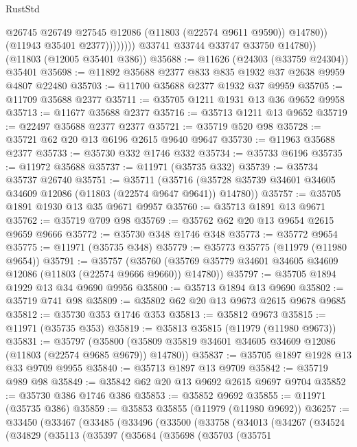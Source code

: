 \begin{lexlean}{RustStd}
\begin{coremodule}
                          @26745
                          @26749
                          @27545
                          @12086
                          (@11803 (@22574 @9611 @9590))
                          @14780))
                      (@11943 @35401 @2377))))))))
        @33741
        @33744
        @33747
        @33750
        @14780))
    (@11803 (@12005 @35401 @386))
@35688 := @11626 (@24303 (@33759 @24304)) @35401
@35698 := @11892 @35688 @2377 @833 @835 @1932 @37 @2638 @9959 @4807 @22480
@35703 := @11700 @35688 @2377 @1932 @37 @9959
@35705 := @11709 @35688 @2377
@35711 := @35705 @1211 @1931 @13 @36 @9652 @9958
@35713 := @11677 @35688 @2377
@35716 := @35713 @1211 @13 @9652
@35719 := @22497 @35688 @2377 @2377
@35721 := @35719 @520 @98
@35728 := @35721 @62 @20 @13 @6196 @2615 @9640 @9647
@35730 := @11963 @35688 @2377
@35733 := @35730 @332 @1746 @332
@35734 := @35733 @6196
@35735 := @11972 @35688
@35737 := @11971 (@35735 @332)
@35739 := @35734 @35737 @26740
@35751 := @35711
    (@35716 (@35728 @35739 @34601 @34605 @34609 @12086 (@11803 (@22574 @9647 @9641)) @14780))
@35757 := @35705 @1891 @1930 @13 @35 @9671 @9957
@35760 := @35713 @1891 @13 @9671
@35762 := @35719 @709 @98
@35769 := @35762 @62 @20 @13 @9654 @2615 @9659 @9666
@35772 := @35730 @348 @1746 @348
@35773 := @35772 @9654
@35775 := @11971 (@35735 @348)
@35779 := @35773 @35775 (@11979 (@11980 @9654))
@35791 := @35757
    (@35760 (@35769 @35779 @34601 @34605 @34609 @12086 (@11803 (@22574 @9666 @9660)) @14780))
@35797 := @35705 @1894 @1929 @13 @34 @9690 @9956
@35800 := @35713 @1894 @13 @9690
@35802 := @35719 @741 @98
@35809 := @35802 @62 @20 @13 @9673 @2615 @9678 @9685
@35812 := @35730 @353 @1746 @353
@35813 := @35812 @9673
@35815 := @11971 (@35735 @353)
@35819 := @35813 @35815 (@11979 (@11980 @9673))
@35831 := @35797
    (@35800 (@35809 @35819 @34601 @34605 @34609 @12086 (@11803 (@22574 @9685 @9679)) @14780))
@35837 := @35705 @1897 @1928 @13 @33 @9709 @9955
@35840 := @35713 @1897 @13 @9709
@35842 := @35719 @989 @98
@35849 := @35842 @62 @20 @13 @9692 @2615 @9697 @9704
@35852 := @35730 @386 @1746 @386
@35853 := @35852 @9692
@35855 := @11971 (@35735 @386)
@35859 := @35853 @35855 (@11979 (@11980 @9692))
@36257 := @33450
    (@33467
      (@33485
        (@33496
          (@33500
            (@33758
              (@34013
                (@34267
                  (@34524
                    (@34829
                      (@35113
                        (@35397
                          (@35684
                            (@35698
                              (@35703
                                (@35751

\end{coremodule}
\end{lexlean}
